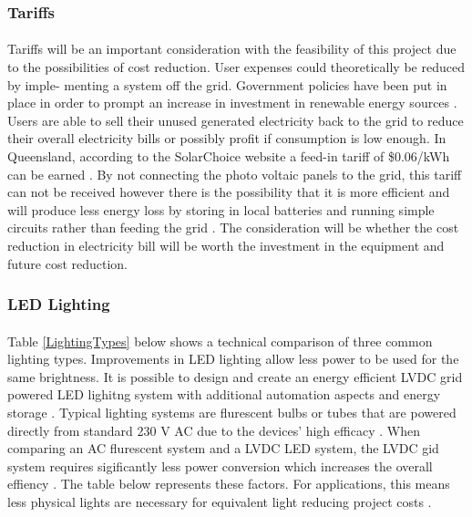 \subsubsection{Tariffs}

\paragraph{}
Tariffs will be an important consideration with the feasibility of this project due to the
possibilities of cost reduction. User expenses could theoretically be reduced by imple-
menting a system off the grid. Government policies have been put in place in order
to prompt an increase in investment in renewable energy sources \cite{Nelson2011}. Users are able to sell their unused generated electricity back to the grid to reduce their overall electricity
bills or possibly profit if consumption is low enough. In Queensland, according to the
SolarChoice website a feed-in tariff of \$0.06/kWh can be earned \cite{website:SolarChoice}. By not connecting the photo voltaic panels to the grid, this tariff can not be received however there is the possibility that it is more efficient and will produce less energy loss by storing in local
batteries and running simple circuits rather than feeding the grid \cite{AntoniouATzimasARowland2015}. The consideration will be whether the cost reduction in electricity bill will be worth the investment in the equipment and future cost reduction.   

\subsubsection{LED Lighting}

\paragraph{}
Table \ref{LightingTypes} below shows a technical comparison of three common lighting types. Improvements in LED lighting allow less power to be used for the same brightness. It is possible to design and create an energy efficient LVDC grid powered LED lighitng system with additional automation aspects and energy storage \cite{Koh2011}. Typical lighting systems are flurescent bulbs or tubes that are powered directly from standard 230 V AC due to the devices' high efficacy \cite{Koh2011}. When comparing an AC flurescent system and a LVDC LED system, the LVDC gid system requires sigificantly less power conversion which increases the overall effiency \cite{Koh2011}. The table below represents these factors. For applications, this means less physical lights are necessary for equivalent light reducing project costs \cite{website:LED}.  

